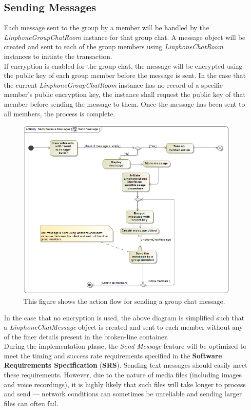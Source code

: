 \documentclass[11pt]{article}
\begin{document}
\subsection{Sending Messages}
Each message sent to the group by a member will be handled by the \textit{LinphoneGroupChatRoom} instance for that group chat. A message object will be created and sent to each of the group members using \textit{LinphoneChatRoom} instances to initiate the transaction.\\
If encryption is enabled for the group chat, the message will be encrypted using the public key of each group member before the message is sent. In the case that the current \textit{LinphoneGroupChatRoom} instance has no record of a specific member's public encryption key, the instance shall request the public key of that member before sending the message to them. Once the message has been sent to all members, the process is complete.
\begin{figure}[H]
\centering
\includegraphics[width=5in]{./images/activity_send_message.png}
\caption[Send Message Activity Diagram]{This figure shows the action flow for sending a group chat message.}
\label{ad-send-message}
\end{figure}
In the case that no encryption is used, the above diagram is simplified such that a \textit{LinphoneChatMessage} object is created and sent to each member without any of the finer details present in the broken-line container.\\

During the implementation phase, the \textit{Send Message} feature will be optimized to meet the timing and success rate requirements specified in the \textbf{Software Requirements Specification} (\textbf{SRS}). Sending text messages should easily meet these requirements. However, due to the nature of media files (including images and voice recordings), it is highly likely that such files will take longer to process and send --- network conditions can sometimes be unreliable and sending larger files can often fail.
\end{document}
